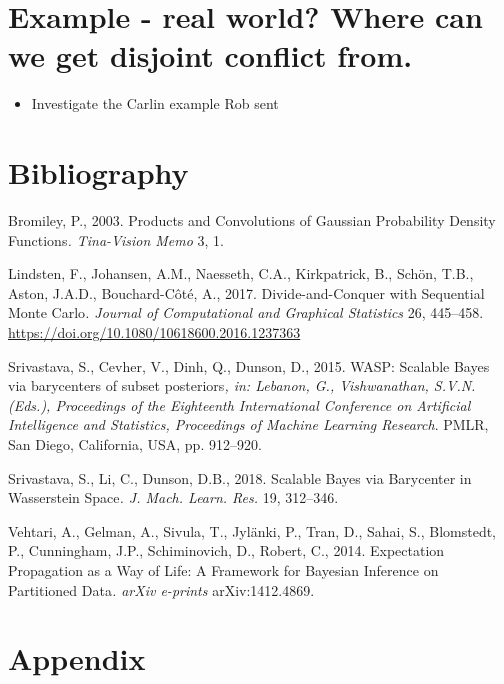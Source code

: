 \documentclass[10pt,a4paper,]{article}
\providecommand{\tightlist}{%
  \setlength{\itemsep}{0pt}\setlength{\parskip}{0pt}}
\begin{document}
\section{Example - real world? Where can we get disjoint conflict
from.}\label{example---real-world-where-can-we-get-disjoint-conflict-from.}

\begin{itemize}
\tightlist
\item
  Investigate the Carlin example Rob sent
\end{itemize}

\newpage

\section*{Bibliography}\label{bibliography}

\hypertarget{refs}{}
\hypertarget{ref-bromiley:03}{}
Bromiley, P., 2003. Products and Convolutions of Gaussian Probability
Density Functions\emph{. Tina-Vision Memo} 3, 1.

\hypertarget{ref-lindsten:etal:17}{}
Lindsten, F., Johansen, A.M., Naesseth, C.A., Kirkpatrick, B., Schön,
T.B., Aston, J.A.D., Bouchard-Côté, A., 2017. Divide-and-Conquer with
Sequential Monte Carlo\emph{. Journal of Computational and Graphical
Statistics} 26, 445--458.
\url{https://doi.org/10.1080/10618600.2016.1237363}

\hypertarget{ref-srivastava:etal:15}{}
Srivastava, S., Cevher, V., Dinh, Q., Dunson, D., 2015. WASP: Scalable
Bayes via barycenters of subset posteriors\emph{, in: Lebanon, G.,
Vishwanathan, S.V.N. (Eds.), Proceedings of the Eighteenth International
Conference on Artificial Intelligence and Statistics, Proceedings of
Machine Learning Research}. PMLR, San Diego, California, USA, pp.
912--920.

\hypertarget{ref-srivastava:li:dunson:18}{}
Srivastava, S., Li, C., Dunson, D.B., 2018. Scalable Bayes via
Barycenter in Wasserstein Space\emph{. J. Mach. Learn. Res.} 19,
312--346.

\hypertarget{ref-vehtari:etal:14}{}
Vehtari, A., Gelman, A., Sivula, T., Jylänki, P., Tran, D., Sahai, S.,
Blomstedt, P., Cunningham, J.P., Schiminovich, D., Robert, C., 2014.
Expectation Propagation as a Way of Life: A Framework for Bayesian
Inference on Partitioned Data\emph{. arXiv e-prints} arXiv:1412.4869.

\newpage

\renewcommand{\thesection}{\Alph{section}}

\setcounter{section}{0}

\section{Appendix}\label{appendix}
\end{document}
